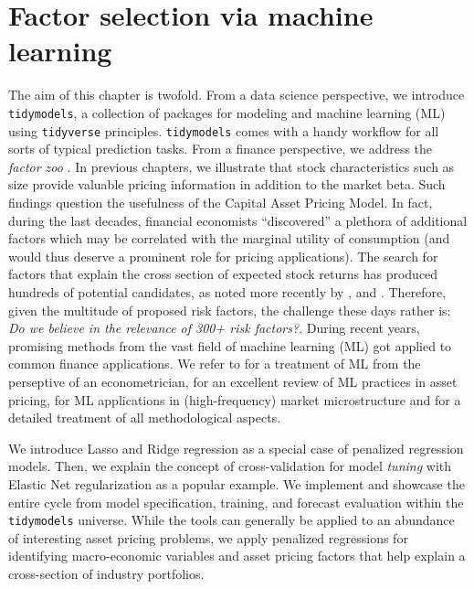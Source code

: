 \documentclass[
]{book}
\begin{document}
\hypertarget{factor-selection-via-machine-learning}{%
\chapter{Factor selection via machine learning}\label{factor-selection-via-machine-learning}}

The aim of this chapter is twofold. From a data science perspective, we introduce \texttt{tidymodels}, a collection of packages for modeling and machine learning (ML) using \texttt{tidyverse} principles. \texttt{tidymodels} comes with a handy workflow for all sorts of typical prediction tasks. From a finance perspective, we address the \emph{factor zoo} \citep{Cochrane2011}. In previous chapters, we illustrate that stock characteristics such as size provide valuable pricing information in addition to the market beta.
Such findings question the usefulness of the Capital Asset Pricing Model.
In fact, during the last decades, financial economists ``discovered'' a plethora of additional factors which may be correlated with the marginal utility of consumption (and would thus deserve a prominent role for pricing applications). The search for factors that explain the cross section of expected stock returns has produced hundreds of potential candidates, as noted more recently by \citet{Harvey2016}, \citet{McLean2016} and \citet{Hou2020}.
Therefore, given the multitude of proposed risk factors, the challenge these days rather is: \emph{Do we believe in the relevance of 300+ risk factors?}. During recent years, promising methods from the vast field of machine learning (ML) got applied to common finance applications. We refer to \citet{Mullainathan2017} for a treatment of ML from the perseptive of an econometrician, \citet{Nagel2021} for an excellent review of ML practices in asset pricing, \citet{Easley2021} for ML applications in (high-frequency) market microstructure and \citet{Dixon2020} for a detailed treatment of all methodological aspects.

We introduce Lasso and Ridge regression as a special case of penalized regression models. Then, we explain the concept of cross-validation for model \emph{tuning} with Elastic Net regularization as a popular example. We implement and showcase the entire cycle from model specification, training, and forecast evaluation within the \texttt{tidymodels} universe. While the tools can generally be applied to an abundance of interesting asset pricing problems, we apply penalized regressions for identifying macro-economic variables and asset pricing factors that help explain a cross-section of industry portfolios.
\end{document}
